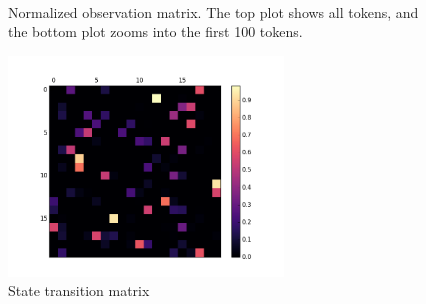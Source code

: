 \begin{figure}[h!]
	\centering
	 \\
	\caption{Normalized observation matrix. The top plot shows all tokens, and the bottom plot zooms into the first 100 tokens.}\label{fig:observation-matrix}
\end{figure}

\begin{figure}[h!]
	\centering
	\includegraphics[width=0.65\textwidth, clip=true, trim=1cm 1cm 1cm 1cm]{transition_matrix}
	\caption{State transition matrix}\label{fig:state-transition}
\end{figure}




